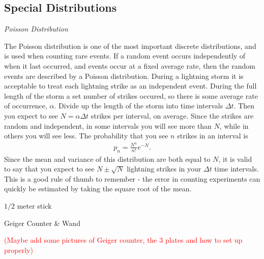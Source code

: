 \documentclass[addpoints]{physlabs}  %
\begin{document}
\begin{labsection}
\begin{theory}
\subsection*{Special Distributions}
\begin{center}
\textit{Poisson Distribution}
\end{center}
The Poisson distribution is one of the most important discrete distributions, and is used when counting rare events.
If a random event occurs independently of when it last occurred, and events occur at a fixed average rate, then the random events are described by a Poisson distribution.
During a lightning storm it is acceptable to treat each lightning strike as an independent event.
During the full length of the storm a set number of strikes occured, so there is some average rate of occurrence, $\alpha$.
Divide up the length of the storm into time intervals $\Delta t$.
Then you expect to see $N=\alpha \Delta t$ strikes per interval, on average.
Since the strikes are random and independent, in some intervals you will see more than $N$, while in others you will see less.
The probability that you see $n$ strikes in an interval is
\begin{align}
    p_n=\frac{N^n}{n!}e^{-N}.
\end{align}
Since the mean and variance of this distribution are both equal to $N$, it is valid to say that you expect to see $N\pm\sqrt{N}$ lightning strikes in your $\Delta t$ time intervals.
This is a good rule of thumb to remember - the error in counting experiments can quickly be estimated by taking the square root of the mean.


\end{theory}
\begin{equipment}
    \item $1/2$ meter stick
    \item Geiger Counter \& Wand
\end{equipment}

\textcolor{red}{(Maybe add some pictures of Geiger counter, the 3 plates and how to set up properly)}

\begin{experiment}

\end{experiment}
\end{labsection}
\end{document}

